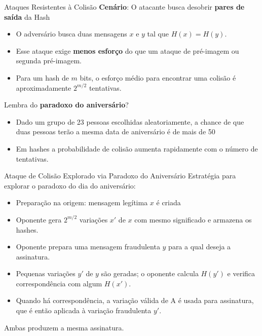 \begin{frame}{Ataques Resistentes à Colisão}
    \textbf{Cenário}: O atacante busca desobrir \textbf{pares de saída} da Hash
    \begin{itemize}
        \item O adversário busca duas mensagens \(x\) e \(y\) tal que \(H(x) = H(y)\).
        \item Esse ataque exige \textbf{menos esforço} do que um ataque de pré-imagem ou segunda pré-imagem.
        \item Para um hash de \(m\) bits, o esforço médio para encontrar uma colisão é aproximadamente \(2^{m/2}\) tentativas.
    \end{itemize}
    Lembra do \textbf{paradoxo do aniversário}?
    \begin{itemize}
        \item Dado um grupo de 23 pessoas escolhidas aleatoriamente, a chance de que duas pessoas terão a mesma data de aniversário é de mais de 50%
        \item Em hashes a probabilidade de colisão aumenta rapidamente com o número de tentativas.
    \end{itemize}

\end{frame}
\begin{frame}{Ataque de Colisão Explorado via Paradoxo do Aniversário}
    Estratégia para explorar o paradoxo do dia do aniversário:
    \begin{itemize}
        \item Preparação na origem: mensagem legítima \(x\) é criada
        \item Oponente gera \(2^{m/2}\) variações \(x'\) de \(x\) com mesmo significado e armazena os hashes.
        \item Oponente prepara uma mensagem fraudulenta \(y\) para a qual deseja a assinatura.
        \item Pequenas variações \(y'\) de \(y\) são geradas; o oponente calcula \(H(y')\) e verifica correspondência com algum \(H(x')\).
        \item Quando há correspondência, a variação válida de A é usada para assinatura, que é então aplicada à variação fraudulenta \(y'\).
    \end{itemize}
    Ambas produzem a mesma assinatura.
\end{frame}
